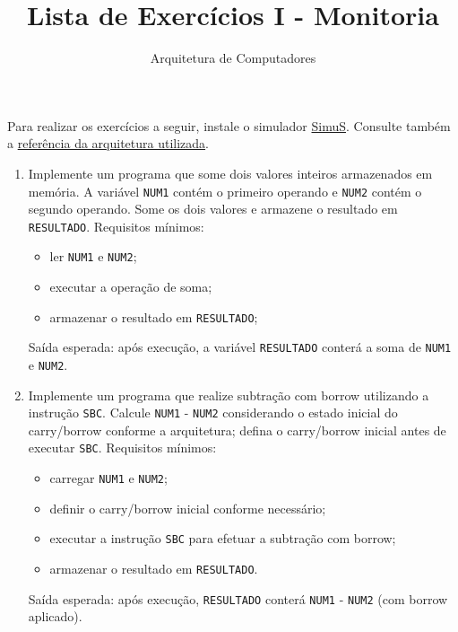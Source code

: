 \documentclass[12pt,a4paper]{article}
\title{Lista de Exercícios I - Monitoria}
\author{Arquitetura de Computadores}
\date{}
\begin{document}
\maketitle
\noindent Para realizar os exercícios a seguir, instale o simulador \href{https://github.com/Simulador-Simus/SimuS}{SimuS}. Consulte também a \href{https://github.com/Simulador-SimuS/SimuS/blob/master/docs/simus.pdf}{referência da arquitetura utilizada}.

\begin{enumerate}[left=0pt,label=\textbf{Exercício \arabic*:},itemsep=8pt]

\item Implemente um programa que some dois valores inteiros armazenados em memória.
A variável \texttt{NUM1} contém o primeiro operando e \texttt{NUM2} contém o segundo operando. Some os dois valores e armazene o resultado em \texttt{RESULTADO}.
Requisitos mínimos:
\begin{itemize}
	\item ler \texttt{NUM1} e \texttt{NUM2};
	\item executar a operação de soma;
	\item armazenar o resultado em \texttt{RESULTADO};
\end{itemize}
Saída esperada: após execução, a variável \texttt{RESULTADO} conterá a soma de \texttt{NUM1} e \texttt{NUM2}.

\item Implemente um programa que realize subtração com borrow utilizando a instrução \texttt{SBC}.
Calcule \texttt{NUM1} - \texttt{NUM2} considerando o estado inicial do carry/borrow conforme a arquitetura; defina o carry/borrow inicial antes de executar \texttt{SBC}.
Requisitos mínimos:
\begin{itemize}
	\item carregar \texttt{NUM1} e \texttt{NUM2};
	\item definir o carry/borrow inicial conforme necessário;
	\item executar a instrução \texttt{SBC} para efetuar a subtração com borrow;
	\item armazenar o resultado em \texttt{RESULTADO}.
\end{itemize}
Saída esperada: após execução, \texttt{RESULTADO} conterá \texttt{NUM1} - \texttt{NUM2} (com borrow aplicado).


\end{enumerate}
\end{document}
